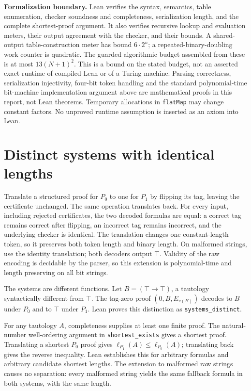\documentclass[11pt]{article}
\begin{document}
\textbf{Formalization boundary.} Lean verifies the syntax, semantics, table enumeration, checker soundness and completeness, serialization length, and the complete shortest-proof argument. It also verifies recursive lookup and evaluation meters, their output agreement with the checker, and their bounds. A shared-output table-construction meter has bound $6\cdot2^n$; a repeated-binary-doubling work counter is quadratic. The guarded algorithmic budget assembled from these is at most $13(N+1)^2$. This is a bound on the stated budget, not an asserted exact runtime of compiled Lean or of a Turing machine. Parsing correctness, serialization injectivity, four-bit token handling and the standard polynomial-time bit-machine implementation argument above are mathematical proofs in this report, not Lean theorems. Temporary allocations in \texttt{flatMap} may change constant factors. No unproved runtime assumption is inserted as an axiom into Lean.

\section{Distinct systems with identical lengths}
Translate a structured proof for $P_0$ to one for $P_1$ by flipping its tag, leaving the certificate unchanged. The same operation translates back. For every input, including rejected certificates, the two decoded formulas are equal: a correct tag remains correct after flipping, an incorrect tag remains incorrect, and the underlying checker is identical. The translation changes one constant-length token, so it preserves both token length and binary length. On malformed strings, use the identity translation; both decoders output $\top$. Validity of the raw encoding is decidable by the parser, so this extension is polynomial-time and length preserving on all bit strings.

The systems are different functions. Let $B=(\top\to\top)$, a tautology syntactically different from $\top$. The tag-zero proof $(0,B,E_{v(B)})$ decodes to $B$ under $P_0$ and to $\top$ under $P_1$. Lean proves this distinction as \texttt{systems\_distinct}.

For any tautology $A$, completeness supplies at least one finite proof. The natural-number well-ordering argument in \texttt{shortest\_exists} gives a shortest proof. Translating a shortest $P_0$ proof gives $\ell_{P_1}(A)\leq\ell_{P_0}(A)$; translating back gives the reverse inequality. Lean establishes this for arbitrary formulas and arbitrary candidate shortest lengths. The extension to malformed raw strings causes no separation: every malformed string yields the same fallback formula in both systems, with the same length.
\end{document}
